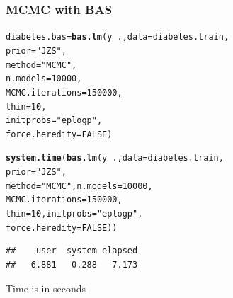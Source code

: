 \documentclass[]{beamer}\usepackage[]{graphicx}\usepackage[]{color}
\makeatletter
\newcommand{\hlnum}[1]{\textcolor[rgb]{0.686,0.059,0.569}{#1}}%
\newcommand{\hlstr}[1]{\textcolor[rgb]{0.192,0.494,0.8}{#1}}%
\newcommand{\hlopt}[1]{\textcolor[rgb]{0,0,0}{#1}}%
\newcommand{\hlstd}[1]{\textcolor[rgb]{0.345,0.345,0.345}{#1}}%
\newcommand{\hlkwb}[1]{\textcolor[rgb]{0.69,0.353,0.396}{#1}}%
\newcommand{\hlkwc}[1]{\textcolor[rgb]{0.333,0.667,0.333}{#1}}%
\newcommand{\hlkwd}[1]{\textcolor[rgb]{0.737,0.353,0.396}{\textbf{#1}}}%
\newenvironment{kframe}{%
 \def\at@end@of@kframe{}%
 \ifinner\ifhmode%
  \def\at@end@of@kframe{\end{minipage}}%
  \begin{minipage}{\columnwidth}%
 \fi\fi%
 \def\FrameCommand##1{\hskip\@totalleftmargin \hskip-\fboxsep
 \colorbox{shadecolor}{##1}\hskip-\fboxsep
     \hskip-\linewidth \hskip-\@totalleftmargin \hskip\columnwidth}%
 \MakeFramed {\advance\hsize-\width
   \@totalleftmargin\z@ \linewidth\hsize
   \@setminipage}}%
 {\par\unskip\endMakeFramed%
 \at@end@of@kframe}
\newenvironment{knitrout}{}{} %
\makeatother
\begin{document}
\begin{frame}[fragile]\frametitle{MCMC with BAS}
\begin{knitrout}
\color{fgcolor}\begin{kframe}
\begin{alltt}
\hlstd{diabetes.bas} \hlkwb{=} \hlkwd{bas.lm}\hlstd{(y} \hlopt{~} \hlstd{.,} \hlkwc{data}\hlstd{=diabetes.train,}
                      \hlkwc{prior} \hlstd{=} \hlstr{"JZS"}\hlstd{,}
                      \hlkwc{method}\hlstd{=}\hlstr{"MCMC"}\hlstd{,}
                      \hlkwc{n.models} \hlstd{=} \hlnum{10000}\hlstd{,}
                      \hlkwc{MCMC.iterations}\hlstd{=}\hlnum{150000}\hlstd{,}
                      \hlkwc{thin} \hlstd{=} \hlnum{10}\hlstd{,}
                      \hlkwc{initprobs}\hlstd{=}\hlstr{"eplogp"}\hlstd{,}
                      \hlkwc{force.heredity}\hlstd{=}\hlnum{FALSE}\hlstd{)}

\hlkwd{system.time}\hlstd{(}\hlkwd{bas.lm}\hlstd{(y} \hlopt{~} \hlstd{.,} \hlkwc{data}\hlstd{=diabetes.train,}
                   \hlkwc{prior} \hlstd{=} \hlstr{"JZS"}\hlstd{,}
                   \hlkwc{method}\hlstd{=}\hlstr{"MCMC"}\hlstd{,} \hlkwc{n.models} \hlstd{=} \hlnum{10000}\hlstd{,}
                   \hlkwc{MCMC.iterations}\hlstd{=}\hlnum{150000}\hlstd{,}
                   \hlkwc{thin} \hlstd{=} \hlnum{10}\hlstd{,}  \hlkwc{initprobs}\hlstd{=}\hlstr{"eplogp"}\hlstd{,}
                   \hlkwc{force.heredity}\hlstd{=}\hlnum{FALSE}\hlstd{))}
\end{alltt}
\begin{verbatim}
##    user  system elapsed 
##   6.881   0.288   7.173
\end{verbatim}
\end{kframe}
\end{knitrout}

Time is in seconds

\end{frame}
\end{document}
